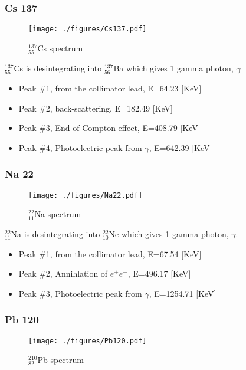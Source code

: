 \documentclass[a4paper,12pt,oneside]{article}
\begin{document}
\newpage
\subsubsection{Cs 137}
\begin{figure}[h!]
	\begin{center}
	\texttt{[image: ./figures/Cs137.pdf]}
	\caption{$_{55}^{137}$Cs spectrum} \label{fig:Cs137}
	\end{center}
\end{figure}

$_{55}^{137}$Cs is desintegrating into $_{56}^{137}$Ba which gives 1 gamma photon, $\gamma$

\begin{itemize}
\item Peak \#1, from the collimator lead, E=64.23 [KeV]
\item Peak \#2, back-scattering, E=182.49 [KeV]
\item Peak \#3, End of Compton effect, E=408.79 [KeV]
\item Peak \#4, Photoelectric peak from $\gamma$, E=642.39 [KeV]
\end{itemize}


\newpage
\subsubsection{Na 22}
\begin{figure}[h!]
	\begin{center}
	\texttt{[image: ./figures/Na22.pdf]}
	\caption{$_{11}^{22}$Na spectrum} \label{fig:Na22}
	\end{center}
\end{figure}

$_{11}^{22}$Na is desintegrating into $_{10}^{22}$Ne which gives 1 gamma photon, $\gamma$.

\begin{itemize}
\item Peak \#1, from the collimator lead, E=67.54 [KeV]
\item Peak \#2, Annihlation of $e^+e^-$, E=496.17 [KeV]
\item Peak \#3, Photoelectric peak from $\gamma$, E=1254.71 [KeV]
\end{itemize}


\newpage
\subsubsection{Pb 120}
\begin{figure}[h!]
	\begin{center}
	\texttt{[image: ./figures/Pb120.pdf]}
	\caption{$_{82}^{210}$Pb spectrum} \label{fig:Pb120}
	\end{center}
\end{figure}
\end{document}
